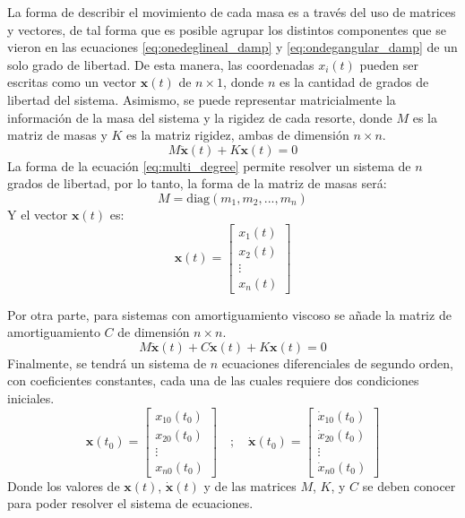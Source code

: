 La forma de describir el movimiento de cada masa es a través del uso de matrices y vectores, de tal forma que es posible agrupar los distintos componentes que se vieron en las ecuaciones \ref{eq:onedeglineal_damp} y \ref{eq:ondegangular_damp} de un solo grado de libertad. De esta manera, las coordenadas $x_i(t)$ pueden ser escritas como un vector $\mathbf{x}(t)$ de $n \times 1$, donde $n$ es la cantidad de grados de libertad del sistema. Asimismo, se puede representar matricialmente la información de la masa del sistema y la rigidez de cada resorte, donde $\mathit{M}$ es la matriz de masas y $\mathit{K}$ es la matriz rigidez, ambas de dimensión $n \times n$. 
\begin{equation}\label{eq:multi_degree}
	\mathit{M}\mathbf{\ddot{x}}(t) + \mathit{K}\mathbf{x}(t) = 0
\end{equation}
La forma de la ecuación \ref{eq:multi_degree} permite resolver un sistema de $n$ grados de libertad, por lo tanto, la forma de la matriz de masas será:
\begin{equation*}
	\mathit{M}=\text{diag}(m_1,m_2,...,m_n)
\end{equation*}
Y el vector $\mathbf{x}(t)$ es:
\begin{equation*}
	\mathbf{x}(t) = \begin{bmatrix}
	x_1(t)\\
	x_2(t)\\
	\vdots\\
	x_n(t)
	\end{bmatrix}
\end{equation*} 

Por otra parte, para sistemas con amortiguamiento viscoso se añade la matriz de amortiguamiento $\mathit{C}$ de dimensión $n \times n$. 
\begin{equation}\label{eq:multi_degreedamp}
	\mathit{M}\mathbf{\ddot{x}}(t) + \mathit{C}\mathbf{\dot{x}}(t) + \mathit{K}\mathbf{x}(t) = 0	
\end{equation}
Finalmente, se tendrá un sistema de $n$ ecuaciones diferenciales de segundo orden, con coeficientes constantes, cada una de las cuales requiere dos condiciones iniciales.
\begin{equation}
	\mathbf{x}(t_0) = \begin{bmatrix}
	x_{10}(t_0)\\
	x_{20}(t_0)\\
	\vdots\\
	x_{n0}(t_0)
	\end{bmatrix} \quad ; \quad \mathbf{\dot{x}}(t_0) = \begin{bmatrix}
	\dot{x}_{10}(t_0)\\
	\dot{x}_{20}(t_0)\\
	\vdots\\
	\dot{x}_{n0}(t_0)
	\end{bmatrix}
\end{equation}
Donde los valores de $\mathbf{x}(t)$, $\mathbf{\dot{x}}(t)$ y de las matrices $\mathit{M}$, $\mathit{K}$, y $\mathit{C}$ se deben conocer para poder resolver el sistema de ecuaciones. 

